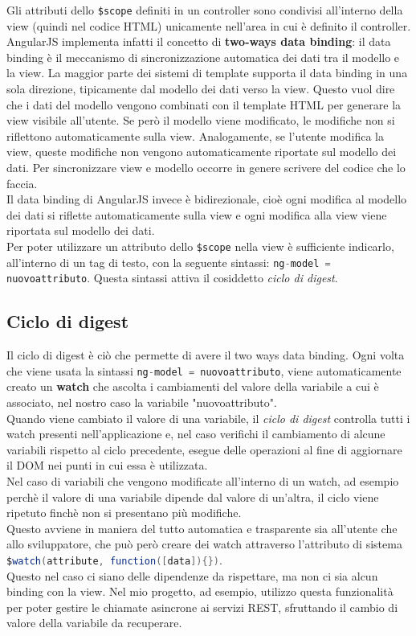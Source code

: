 Gli attributi dello \lstinline[language=HTML]!$scope! definiti in un controller sono condivisi all'interno della view (quindi nel codice HTML) unicamente nell'area in cui è definito il controller. AngularJS implementa infatti il concetto di \textbf{two-ways data binding}: il data binding è il meccanismo di sincronizzazione automatica dei dati tra il modello e la view. La maggior parte dei sistemi di template supporta il data binding in una sola direzione, tipicamente dal modello dei dati verso la view. Questo vuol dire che i dati del modello vengono combinati con il template HTML per generare la view visibile all’utente. Se però il modello viene modificato, le modifiche non si riflettono automaticamente sulla view. Analogamente, se l’utente modifica la view, queste modifiche non vengono automaticamente riportate sul modello dei dati. Per sincronizzare view e modello occorre in genere scrivere del codice che lo faccia.\\
Il data binding di AngularJS invece è bidirezionale, cioè ogni modifica al modello dei dati si riflette automaticamente sulla view e ogni modifica alla view viene riportata sul modello dei dati.\\
Per poter utilizzare un attributo dello \lstinline[language=HTML]!$scope! nella view è sufficiente indicarlo, all'interno di un tag di testo, con la seguente sintassi: \lstinline[language=Java]!ng-model = nuovoattributo!. Questa sintassi attiva il cosiddetto \emph{ciclo di digest}.

\subsection{Ciclo di digest}
Il ciclo di digest è ciò che permette di avere il two ways data binding. Ogni volta che viene usata la sintassi \lstinline[language=Java]!ng-model = nuovoattributo!, viene automaticamente creato un \textbf{watch} che ascolta i cambiamenti del valore della variabile a cui è associato, nel nostro caso la variabile "nuovoattributo".\\
Quando viene cambiato il valore di una variabile, il \emph{ciclo di digest} controlla tutti i watch presenti nell'applicazione e, nel caso verifichi il cambiamento di alcune variabili rispetto al ciclo precedente, esegue delle operazioni al fine di aggiornare il DOM nei punti in cui essa è utilizzata.\\
Nel caso di variabili che vengono modificate all'interno di un watch, ad esempio perchè il valore di una variabile dipende dal valore di un'altra, il ciclo viene ripetuto finchè non si presentano più modifiche.\\
Questo avviene in maniera del tutto automatica e trasparente sia all'utente che allo sviluppatore, che può però creare dei watch attraverso l'attributo di sistema \lstinline[language=Java]!$watch(attribute, function([data]){})!.\\ Questo nel caso ci siano delle dipendenze da rispettare, ma non ci sia alcun binding con la view. Nel mio progetto, ad esempio, utilizzo questa funzionalità per poter gestire le chiamate asincrone ai servizi REST, sfruttando il cambio di valore della variabile da recuperare.


